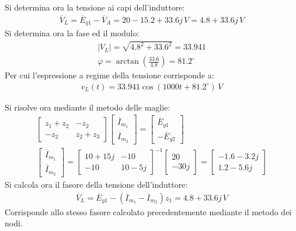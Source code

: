 \documentclass{article}
\begin{document}
Si determina ora la tensione ai capi dell'induttore:
\begin{gather*}
    \overline{V}_L=\overline{E}_{g1}-\overline{V}_A=20-15.2+33.6j\,V=4.8+33.6j\,V
\end{gather*}
Si determina ora la fase ed il modulo:
\begin{gather*}
    |V_L|=\sqrt{4.8^2+33.6^2}=33.941\\
    \varphi=\arctan\left(\displaystyle\frac{33.6}{4.8}\right)=81.2^{\circ}
\end{gather*}
Per cui l'espressione a regime della tensione corrisponde a:
\begin{gather}
    v_L(t)=33.941\cos(1000t+81.2^{\circ})\,V
\end{gather}

Si risolve ora mediante il metodo delle maglie:
\begin{gather*}
    \begin{bmatrix}
        z_1+z_2&-z_2\\-z_2&z_2+z_3
    \end{bmatrix}\begin{bmatrix}
        \overline{I}_{m_1}\\\overline{I}_{m_2}
    \end{bmatrix}=\begin{bmatrix}
        \overline{E}_{g1}\\
        -\overline{E}_{g2}
    \end{bmatrix}\\
    \begin{bmatrix}
        \overline{I}_{m_1}\\\overline{I}_{m_2}
    \end{bmatrix}=\begin{bmatrix}
        10+15j&-10\\-10&10-5j
    \end{bmatrix}^{-1}\begin{bmatrix}
        20\\-30j
    \end{bmatrix}=\begin{bmatrix}
        -1.6-3.2j\\1.2-5.6j
    \end{bmatrix}
\end{gather*}
Si calcola ora il fasore della tensione dell'induttore:
\begin{gather*}
    \overline{V}_L=\overline{E}_{g1}-(\overline{I}_{m_1}-\overline{I}_{m_2})z_1=4.8+33.6j\,V
\end{gather*}
Corrisponde allo stesso fasore calcolato precedentemente mediante il metodo dei nodi.
\end{document}
